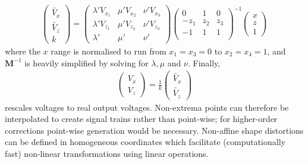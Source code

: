 \begin{align}
\begin{pmatrix}
\widetilde{V_x}  \\
\widetilde{V_z} \\
k
\end{pmatrix}=\begin{pmatrix}
 \lambda' V_{x_1} &  \mu'V_{x_2} &  \nu' V_{x_3} \\
 \lambda' V_{z_1} &  \mu'V_{z_2} &  \nu' V_{z_3} \\
 \lambda' & \mu'  & \nu'
\end{pmatrix}
\begin{pmatrix}
    0 & 1 & 0 \\
    -z_1 & z_2 & z_3 \\
    -1 & 1 & 1 \\
  \end{pmatrix}^{-1}
\begin{pmatrix}
x  \\
z \\
1
\end{pmatrix}
\end{align}
where the \(x\) range is normalised to run from \(x_1 = x_3 = 0\) to \(x_2 =x_4=1\), and \(\textbf{M}^{-1}\) is heavily simplified by solving for \(\lambda, \mu \) and \(\nu \).
Finally,
\begin{align}
\begin{pmatrix}
V_x  \\
V_z
\end{pmatrix} =
\frac{1}{k}
\begin{pmatrix}
\widetilde{V_x}  \\
\widetilde{V_z}
\end{pmatrix}
\end{align}
rescales  voltages to real output voltages.
Non-extrema points can therefore be interpolated to create signal trains rather than point-wise; for higher-order corrections point-wise generation would be necessary.
\if
Non-affine shape distortions can be defined in \gls{homogeneous coordinates} which facilitate (computationally fast) %
non-linear transformations using linear operations.
